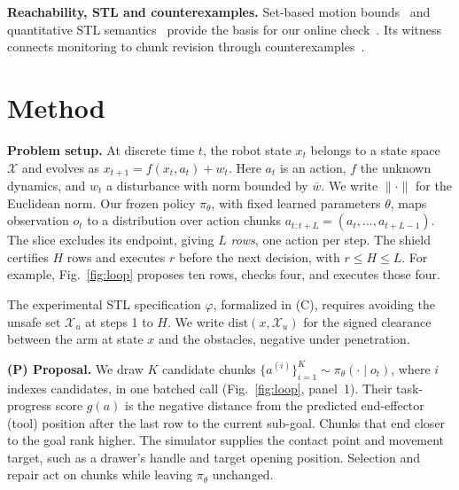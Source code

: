 \documentclass[runningheads]{llncs}
\newcommand{\Xu}{\mathcal{X}_u}
\begin{document}
\textbf{Reachability, STL and counterexamples.} Set-based motion
bounds~\cite{althoff2015cora} and quantitative STL
semantics~\cite{donze2010robust,fainekos2009robustness} provide the basis
for our online check~\cite{deshmukh2017robust}. Its witness connects
monitoring to chunk revision through
counterexamples~\cite{solar2006sketching,clarke2000cegar,annpureddy2011staliro}.

\section{Method}\label{sec:method}

\textbf{Problem setup.} At discrete time $t$, the robot state $x_t$ belongs
to a state space $\mathcal{X}$ and evolves as $x_{t+1}=f(x_t,a_t)+w_t$.
Here $a_t$ is an action, $f$ the unknown dynamics, and $w_t$ a disturbance
with norm bounded by $\bar w$. We write $\|\cdot\|$ for the Euclidean norm.
Our frozen policy $\pi_\theta$, with fixed learned parameters $\theta$,
maps observation $o_t$ to a distribution over action chunks
$a_{t:t+L}=(a_t,\dots,a_{t+L-1})$. The slice excludes its endpoint, giving $L$ \emph{rows}, one action per
step. The shield certifies $H$ rows and executes $r$ before the next
decision, with $r\le H\le L$. For example, Fig.~\ref{fig:loop} proposes ten rows,
checks four, and executes those four.

The experimental STL specification $\varphi$, formalized in (C), requires
avoiding the unsafe set $\Xu$ at steps 1 to $H$. We write
$\mathrm{dist}(x,\Xu)$ for the signed clearance between the arm at state $x$
and the obstacles, negative under penetration.

\textbf{(P) Proposal.} We draw $K$ candidate chunks
$\{a^{(i)}\}_{i=1}^K \sim \pi_\theta(\cdot\mid o_t)$, where $i$ indexes
candidates, in one batched call (Fig.~\ref{fig:loop}, panel~1). Their
task-progress score $g(a)$ is the negative distance from the predicted
end-effector (tool) position after the last row to the current sub-goal.
Chunks that end closer to the goal rank higher. The simulator supplies
the contact point and movement target, such as a drawer's handle and target
opening position. Selection and repair act on chunks while leaving
$\pi_\theta$ unchanged.
\end{document}
